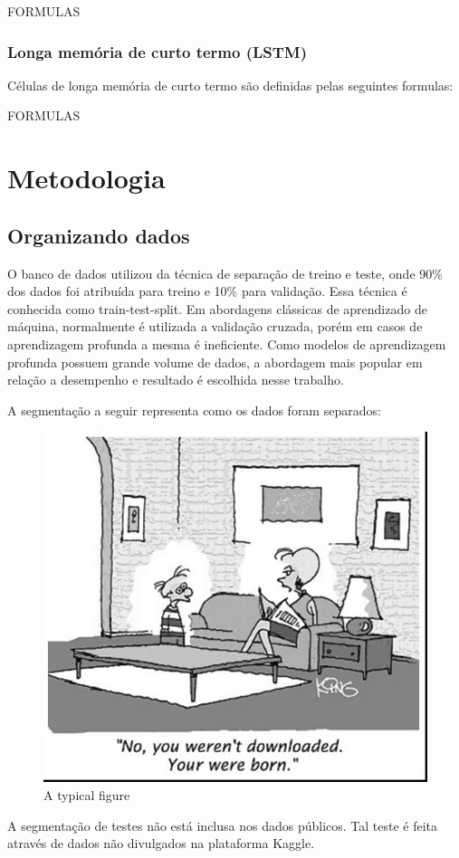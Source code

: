 \documentclass[12pt]{article}
\begin{document}
FORMULAS

\subsubsection{Longa memória de curto termo (LSTM)}

Células de longa memória de curto termo são definidas pelas seguintes formulas:

FORMULAS

\section{Metodologia}

\subsection{Organizando dados}

O banco de dados utilizou da técnica de separação de treino e teste, onde 90\% dos dados foi atribuída para treino e 10\% para validação. Essa técnica é conhecida como train-test-split. Em abordagens clássicas de aprendizado de máquina, normalmente é utilizada a validação cruzada, porém em casos de aprendizagem profunda a mesma é ineficiente. Como modelos de aprendizagem profunda possuem grande volume de dados, a abordagem mais popular em relação a desempenho e resultado é escolhida nesse trabalho.

A segmentação a seguir representa como os dados foram separados:

\begin{figure}[ht]
\centering
\includegraphics[width=.5\textwidth]{images/fig1.jpg}
\caption{A typical figure}
\label{fig:exampleFig1}
\end{figure}

A segmentação de testes não está inclusa nos dados públicos. Tal teste é feita através de dados não divulgados na plataforma Kaggle.
\end{document}
